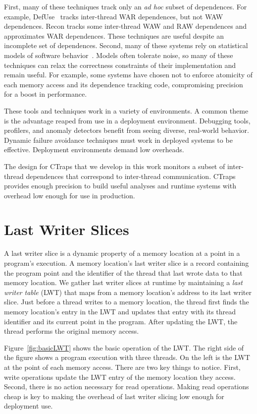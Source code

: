 \documentclass[preprint,9pt]{sigplanconf}
\newcommand{\ctraps}{CTraps\xspace}
\newcommand{\lwt}{LWT\xspace}
\begin{document}
First, many of these techniques track only an {\em ad hoc} subset of
dependences.  For example, DefUse~\cite{defuse} tracks inter-thread WAR
dependences, but not WAW dependences.  Recon tracks some inter-thread WAW and
RAW dependences and approximates WAR dependences.  These techniques are useful
despite an incomplete set of dependences.  Second, many of these systems rely
on statistical models of software
behavior~\cite{avio,cci,defuse,recon,bugaboo,falcon,dmtracker,aviso,threadcriticality,schedpredictionmodel}.
Models often tolerate noise, so many of these techniques can relax the
correctness constraints of their implementation and remain useful.  For
example, some systems have chosen not to enforce atomicity of each memory
access and its dependence tracking code, compromising precision for a boost in
performance.

These tools and techniques work in a variety of environments.  A common theme
is the advantage reaped from use in a deployment environment.  Debugging tools,
profilers, and anomaly detectors benefit from seeing diverse, real-world
behavior.  Dynamic failure avoidance techniques must work in deployed systems
to be effective.  Deployment environments demand low overheads.  

The design for \ctraps that we develop in this work monitors a subset of
inter-thread dependences that correspond to inter-thread communication.
\ctraps provides enough precision to build useful analyses and runtime systems
with overhead low enough for use in production.



\section{Last Writer Slices}
\label{sec:lastwriterslices}
A last writer slice is a dynamic property of a memory location at a point in a
program's execution.   A memory location's last writer slice is a record
containing the program point and the identifier of the thread that last wrote
data to that memory location.  We gather last writer slices at runtime by
maintaining a {\em last writer table} (\lwt) that maps from a memory
location's address to its last writer slice.  Just before a thread writes to a
memory location,  the thread first finds the memory location's entry in the
\lwt and updates that entry with its thread identifier and its current point in the
program.  After updating the \lwt, the thread performs the original memory
access.

Figure~\ref{fig:basicLWT} shows the basic operation of the \lwt.  The right
side of the figure shows a program execution with three threads.  On the left
is the \lwt at the point of each memory access.  There are two key things to
notice.  First, write operations update the \lwt entry of the memory location
they access.  Second, there is no action necessary for read operations.
Making read operations cheap is key to making the overhead of last writer
slicing low enough for deployment use.
\end{document}
